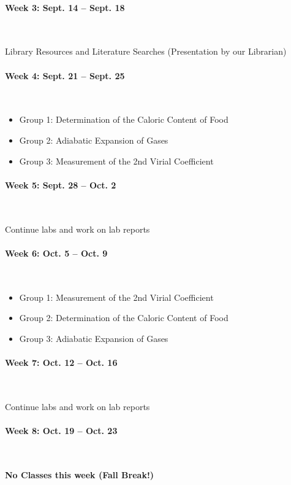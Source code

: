 \documentclass[12pt, letterpaper]{article}
\begin{document}
\paragraph{Week 3: Sept. 14 -- Sept. 18}~

Library Resources and Literature Searches (Presentation by our Librarian)

\paragraph{Week 4: Sept. 21 -- Sept. 25}~

\begin{itemize}
	\item Group 1: Determination of the Caloric Content of Food
	\item Group 2: Adiabatic Expansion of Gases
	\item Group 3: Measurement of the 2nd Virial Coefficient
\end{itemize}

\paragraph{Week 5: Sept. 28 -- Oct. 2}~

Continue labs and work on lab reports

\paragraph{Week 6: Oct. 5 -- Oct. 9}~

\begin{itemize}
	\item Group 1: Measurement of the 2nd Virial Coefficient
	\item Group 2: Determination of the Caloric Content of Food
	\item Group 3: Adiabatic Expansion of Gases
\end{itemize}

\paragraph{Week 7: Oct. 12 -- Oct. 16}~

Continue labs and work on lab reports

\paragraph{Week 8: Oct. 19 -- Oct. 23}~

\textbf{No Classes this week (Fall Break!)}
\end{document}
